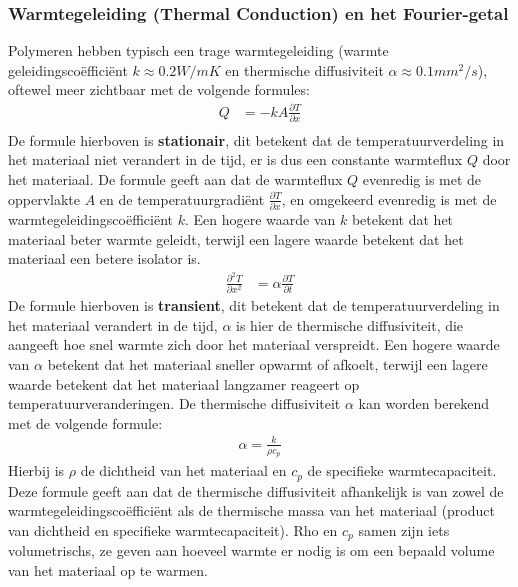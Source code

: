 \subsubsection{Warmtegeleiding (Thermal Conduction) \textbf{en} het Fourier-getal}
Polymeren hebben typisch een trage warmtegeleiding (warmte geleidingscoëfficiënt $k \approx 0.2 W/mK$ en thermische diffusiviteit $\alpha \approx 0.1 mm^2/s$), oftewel meer zichtbaar met de volgende formules:
\begin{align*}
  Q &= -kA \frac{\partial T}{\partial x} \\
\end{align*}
De formule hierboven is \textbf{stationair}, dit betekent dat de temperatuurverdeling in het materiaal niet verandert in de tijd, er is dus een constante warmteflux $Q$ door het materiaal. De formule geeft aan dat de warmteflux $Q$ evenredig is met de oppervlakte $A$ en de temperatuurgradiënt $\frac{\partial T}{\partial x}$, en omgekeerd evenredig is met de warmtegeleidingscoëfficiënt $k$. Een hogere waarde van $k$ betekent dat het materiaal beter warmte geleidt, terwijl een lagere waarde betekent dat het materiaal een betere isolator is.
\newline
\begin{align*}
    \frac{\partial^2 T}{\partial x^2} &= \alpha \frac{\partial T}{\partial t}
\end{align*}
De formule hierboven is \textbf{transient}, dit betekent dat de temperatuurverdeling in het materiaal verandert in de tijd, $\alpha$ is hier de thermische diffusiviteit, die aangeeft hoe snel warmte zich door het materiaal verspreidt. Een hogere waarde van $\alpha$ betekent dat het materiaal sneller opwarmt of afkoelt, terwijl een lagere waarde betekent dat het materiaal langzamer reageert op temperatuurveranderingen.
\newline
De thermische diffusiviteit $\alpha$ kan worden berekend met de volgende formule:
\begin{align*}
    \alpha = \frac{k}{\rho c_p}
\end{align*}
Hierbij is $\rho$ de dichtheid van het materiaal en $c_p$ de specifieke warmtecapaciteit. Deze formule geeft aan dat de thermische diffusiviteit afhankelijk is van zowel de warmtegeleidingscoëfficiënt als de thermische massa van het materiaal (product van dichtheid en specifieke warmtecapaciteit). Rho en $c_p$ samen zijn iets volumetrischs, ze geven aan hoeveel warmte er nodig is om een bepaald volume van het materiaal op te warmen.
\newline
